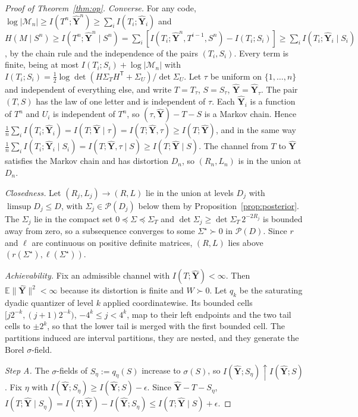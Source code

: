 \documentclass[11pt,onecolumn]{IEEEtran}
\newcommand{\E}{\mathbb{E}}
\newcommand{\hY}{\hat{\mathbf Y}}
\begin{document}
\begin{proof}[Proof of Theorem~\ref{thm:op}]
\emph{Converse.} For any code, $\log|\mathcal M_n|\ge I(T^n;\hY^n)\ge
\sum_iI(T_i;\hY_i)$ and $H(M\mid S^n)\ge I(T^n;\hY^n\mid S^n)
=\sum_i[I(T_i;\hY^n,T^{i-1},S^n)-I(T_i;S_i)]\ge\sum_iI(T_i;\hY_i\mid S_i)$,
by the chain rule and the independence of the pairs $(T_i,S_i)$. Every
term is finite, being at most $I(T_i;S_i)+\log|\mathcal M_n|$ with
$I(T_i;S_i)=\tfrac12\log\det(H\Sigma_TH^{\mathsf T}+\Sigma_U)/\det\Sigma_U$.
Let $\tau$ be uniform on $\{1,\dots,n\}$ and independent of everything
else, and write $T=T_\tau$, $S=S_\tau$, $\hY=\hY_\tau$. The pair $(T,S)$ has
the law of one letter and is independent of $\tau$. Each $\hY_i$ is a
function of $T^n$ and $U_i$ is independent of $T^n$, so
$(\tau,\hY)-T-S$ is a Markov chain. Hence
$\tfrac1n\sum_iI(T_i;\hY_i)=I(T;\hY\mid\tau)=I(T;\hY,\tau)\ge I(T;\hY)$,
and in the same way
$\tfrac1n\sum_iI(T_i;\hY_i\mid S_i)=I(T;\hY,\tau\mid S)\ge I(T;\hY\mid S)$.
The channel from $T$ to $\hY$ satisfies the Markov chain and has
distortion $D_n$, so $(R_n,L_n)$ is in the union at $D_n$.

\emph{Closedness.} Let $(R_j,L_j)\to(R,L)$ lie in the union at levels
$D_j$ with $\limsup D_j\le D$, with $\Sigma_j\in\mathcal P(D_j)$ below them
by Proposition~\ref{prop:posterior}. The $\Sigma_j$ lie in the compact
set $0\preceq\Sigma\preceq\Sigma_T$ and $\det\Sigma_j\ge\det\Sigma_T\,2^{-2R_j}$
is bounded away from zero, so a subsequence converges to some
$\Sigma^\star\succ0$ in $\mathcal P(D)$. Since $r$ and $\ell$ are continuous on
positive definite matrices, $(R,L)$ lies above
$(r(\Sigma^\star),\ell(\Sigma^\star))$.

\emph{Achievability.} Fix an admissible channel with $I(T;\hY)<\infty$.
Then $\E\|\hY\|^2<\infty$ because its distortion is finite and $W\succ0$. Let $q_k$ be the saturating dyadic quantizer of
level $k$ applied coordinatewise. Its bounded cells
$[j2^{-k},(j+1)2^{-k})$, $-4^k\le j<4^k$, map to their left endpoints and
the two tail cells to $\pm2^k$, so that the lower tail is merged with
the first bounded cell. The partitions induced are interval partitions,
they are nested, and they generate the Borel $\sigma$-field.

\emph{Step A.} The $\sigma$-fields of $S_\eta:=q_\eta(S)$ increase to
$\sigma(S)$, so $I(\hY;S_\eta)\uparrow I(\hY;S)$ \cite[Ch.~2]{pinsker1964}.
Fix $\eta$ with $I(\hY;S_\eta)\ge I(\hY;S)-\epsilon$. Since $\hY-T-S_\eta$,
$I(T;\hY\mid S_\eta)=I(T;\hY)-I(\hY;S_\eta)\le I(T;\hY\mid S)+\epsilon$.


\end{proof}
\end{document}
